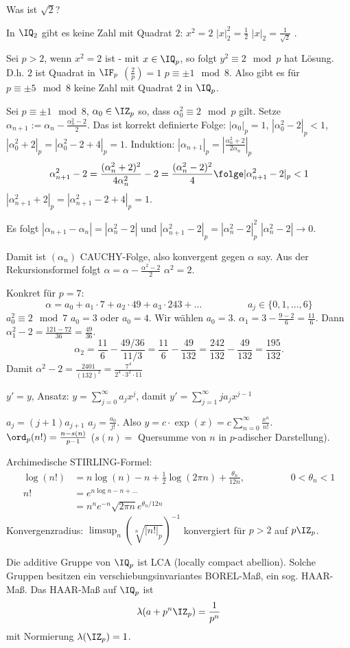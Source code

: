 \begin{Beispiel}
Was ist $\sqrt{2}$?

In $\IQ_2$ gibt es keine Zahl mit Quadrat $2$: $x^2=2$ \folge $|x|_2^2=\frac{1}{2}$ \folge $|x|_2=\frac{1}{\sqrt{2}}$ \lightning.

Sei $p>2$, wenn $x^2=2$ ist - mit $x\in\IQ_p$, so folgt $y^2\equiv 2 \mod{p}$ hat Lösung. D.h. $2$ ist Quadrat in $\IF_p$ \gdw $\left(\frac{2}{p}\right)=1$ \gdw $p\equiv \pm 1\mod{8}$. Also gibt es für $p\equiv  \pm 5\mod{8}$ keine Zahl mit Quadrat $2$ in $\IQ_p$. 

Sei $p\equiv \pm 1\mod{8}$, $\alpha_0\in\IZ_p$ so, dass $\alpha_0^2\equiv 2\mod{p}$ gilt. Setze $\alpha_{n+1}:=\alpha_n-\frac{\alpha_n^2-2}{2}$. Das ist korrekt definierte Folge: $|\alpha_0|_p=1$, $|\alpha_0^2-2|_p<1$, $|\alpha_0^2+2|_p=|\alpha_0^2-2+4|_p=1$. Induktion: $|\alpha_{n+1}|_p=\left|\frac{\alpha_n^2+2}{2\alpha_n}\right|_p$
\[ \alpha_{n+1}^2-2=\frac{(\alpha_n^2+2)^2}{4\alpha_n^2}-2=\frac{(\alpha_n^2-2)^2}{4} \folge |\alpha_{n+1}^2-2|_p<1\]
\folge $|\alpha_{n+1}^2+2|_p=|\alpha_{n+1}^2-2+4|_p=1$.

Es folgt $|\alpha_{n+1}-\alpha_n|=|\alpha_n^2-2|$ und $|\alpha_{n+1}^2-2|_p=|\alpha_n^2-2|_p^2$ \folge $|\alpha_n^2-2| \rightarrow 0$.

Damit ist $(\alpha_n)$ CAUCHY-Folge, also konvergent gegen $\alpha$ say. Aus der Rekursionsformel folgt $\alpha=\alpha-\frac{\alpha^2-2}{2}$ \folge $\alpha^2=2$.

Konkret für $p=7$: \[ \alpha = a_0 + a_1\cdot 7 + a_2\cdot 49 + a_3 \cdot 243 + \ldots \hspace{2cm} a_j\in\{ 0,1,\ldots,6\}\]
$a_0^2\equiv 2\mod{7}$ \folge $a_0=3$ oder $a_0=4$. Wir wählen $a_0=3$. $\alpha_1=3-\frac{9-2}{6}=\frac{11}{6}$. Dann $\alpha_1^2-2=\frac{121-72}{36}=\frac{49}{36}$.
\[ \alpha_2=\frac{11}{6}-\frac{49/36}{11/3}=\frac{11}{6}-\frac{49}{132}=\frac{242}{132}-\frac{49}{132}=\frac{195}{132}.\]
Damit $\alpha^2-2=\frac{2401}{(132)^2}=\frac{7^4}{2^4\cdot 3^2\cdot 11}$
\end{Beispiel}

\begin{Beispiel}
$y'=y$, Ansatz: $y=\sum_{j=0}^\infty a_jx^j$, damit $y'=\sum_{j=1}^\infty ja_jx^{j-1}$

\folge $a_j=(j+1)a_{j+1}$ \folge $a_j=\frac{a_0}{j!}$. Also $y=c\cdot \exp(x)=c\sum_{n=0}^\infty\frac{x^n}{n!}$. $\ord_p(n!)=\frac{n-s(n)}{p-1}$ ($s(n)=$ Quersumme von $n$ in $p$-adischer Darstellung).

Archimedische STIRLING-Formel:
\begin{align*}
\log(n!)&=n\log(n)-n+\frac{1}{2}\log(2\pi n)+\frac{\theta_n}{12n}, \hspace{2cm} 0<\theta_n<1\\
n!&=e^{n\log n - n + \ldots}\\
&= n^n e^{-n}\sqrt{2\pi n} e^{\theta_n/12 n}
\end{align*}
Konvergenzradius: $\limsup_n (\sqrt[n]{|n!|_p})^{-1}$ \folge konvergiert für $p>2$ auf $p\IZ_p$.
\end{Beispiel}

\begin{Beispiel}
Die additive Gruppe von $\IQ_p$ ist LCA (locally compact abellion). Solche Gruppen besitzen ein verschiebungsinvariantes BOREL-Maß, ein sog. HAAR-Maß. Das HAAR-Maß auf $\IQ_p$ ist
\[\lambda(a+p^n\IZ_p)=\frac{1}{p^n} \]
mit Normierung $\lambda(\IZ_p)=1$.
\end{Beispiel}